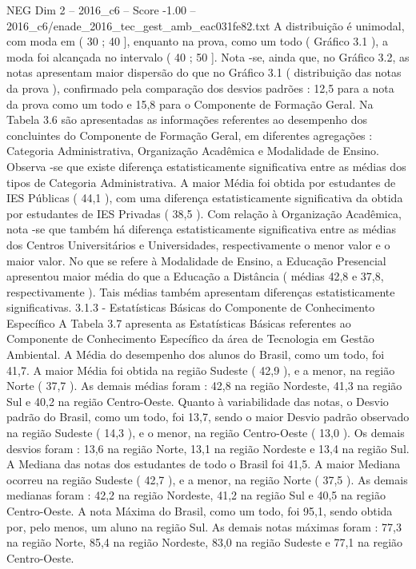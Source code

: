 \begin{textsample}{NEG Dim 2 – 2016\_c6 – Score -1.00 – 2016\_c6/enade\_2016\_tec\_gest\_amb\_eac031fe82.txt}
A distribuição é unimodal, com moda em ( 30 ; 40 ], enquanto na prova, como um todo ( Gráfico 3.1 ), a moda foi alcançada no intervalo ( 40 ; 50 ].
Nota -se, ainda que, no Gráfico 3.2, as notas apresentam maior dispersão do que no Gráfico 3.1 ( distribuição das notas da prova ), confirmado pela comparação dos desvios padrões : 12,5 para a nota da prova como um todo e 15,8 para o Componente de Formação Geral.
Na Tabela 3.6 são apresentadas as informações referentes ao desempenho dos concluintes do Componente de Formação Geral, em diferentes agregações : Categoria Administrativa, Organização Acadêmica e Modalidade de Ensino.
Observa -se que existe diferença estatisticamente significativa entre as médias dos tipos de Categoria Administrativa.
A maior Média foi obtida por estudantes de IES Públicas ( 44,1 ), com uma diferença estatisticamente significativa da obtida por estudantes de IES Privadas ( 38,5 ).
Com relação à Organização Acadêmica, nota -se que também há diferença estatisticamente significativa entre as médias dos Centros Universitários e Universidades, respectivamente o menor valor e o maior valor.
No que se refere à Modalidade de Ensino, a Educação Presencial apresentou maior média do que a Educação a Distância ( médias 42,8 e 37,8, respectivamente ).
Tais médias também apresentam diferenças estatisticamente significativas. 3.1.3 - Estatísticas Básicas do Componente de Conhecimento Específico A Tabela 3.7 apresenta as Estatísticas Básicas referentes ao Componente de Conhecimento Específico da área de Tecnologia em Gestão Ambiental.
A Média do desempenho dos alunos do Brasil, como um todo, foi 41,7.
A maior Média foi obtida na região Sudeste ( 42,9 ), e a menor, na região Norte ( 37,7 ).
As demais médias foram : 42,8 na região Nordeste, 41,3 na região Sul e 40,2 na região Centro-Oeste.
Quanto à variabilidade das notas, o Desvio padrão do Brasil, como um todo, foi 13,7, sendo o maior Desvio padrão observado na região Sudeste ( 14,3 ), e o menor, na região Centro-Oeste ( 13,0 ).
Os demais desvios foram : 13,6 na região Norte, 13,1 na região Nordeste e 13,4 na região Sul.
A Mediana das notas dos estudantes de todo o Brasil foi 41,5.
A maior Mediana ocorreu na região Sudeste ( 42,7 ), e a menor, na região Norte ( 37,5 ).
As demais medianas foram : 42,2 na região Nordeste, 41,2 na região Sul e 40,5 na região Centro-Oeste.
A nota Máxima do Brasil, como um todo, foi 95,1, sendo obtida por, pelo menos, um aluno na região Sul.
As demais notas máximas foram : 77,3 na região Norte, 85,4 na região Nordeste, 83,0 na região Sudeste e 77,1 na região Centro-Oeste.

\end{textsample}
